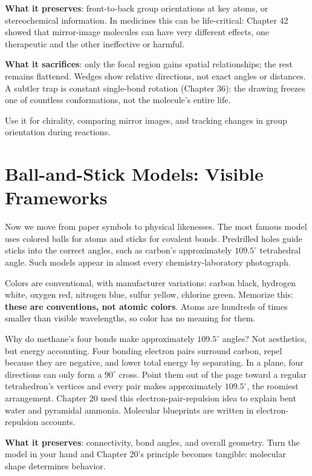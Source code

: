 \textbf{What it preserves}: front-to-back group orientations at key atoms, or stereochemical information. In medicines this can be life-critical: Chapter 42 showed that mirror-image molecules can have very different effects, one therapeutic and the other ineffective or harmful.

\textbf{What it sacrifices}: only the focal region gains spatial relationships; the rest remains flattened. Wedges show relative directions, not exact angles or distances. A subtler trap is constant single-bond rotation (Chapter 36): the drawing freezes one of countless conformations, not the molecule's entire life.

Use it for chirality, comparing mirror images, and tracking changes in group orientation during reactions.

\section{Ball-and-Stick Models: Visible Frameworks}

Now we move from paper symbols to physical likenesses. The most famous model uses colored balls for atoms and sticks for covalent bonds. Predrilled holes guide sticks into the correct angles, such as carbon's approximately $109.5^{\circ}$ tetrahedral angle. Such models appear in almost every chemistry-laboratory photograph.

Colors are conventional, with manufacturer variations: carbon black, hydrogen white, oxygen red, nitrogen blue, sulfur yellow, chlorine green. Memorize this: \textbf{these are conventions, not atomic colors}. Atoms are hundreds of times smaller than visible wavelengths, so color has no meaning for them.

\begin{qiaoliang}
Why do methane's four bonds make approximately $109.5^{\circ}$ angles? Not aesthetics, but energy accounting. Four bonding electron pairs surround carbon, repel because they are negative, and lower total energy by separating. In a plane, four directions can only form a $90^{\circ}$ cross. Point them out of the page toward a regular tetrahedron's vertices and every pair makes approximately $109.5^{\circ}$, the roomiest arrangement. Chapter 20 used this electron-pair-repulsion idea to explain bent water and pyramidal ammonia. Molecular blueprints are written in electron-repulsion accounts.
\end{qiaoliang}

\textbf{What it preserves}: connectivity, bond angles, and overall geometry. Turn the model in your hand and Chapter 20's principle becomes tangible: molecular shape determines behavior.

